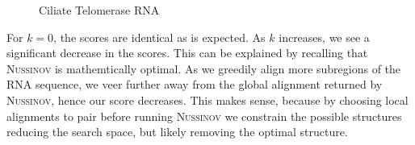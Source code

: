 \documentclass[11pt]{article}
\newcommand{\rf}{\textsc{Nussinov}\xspace}
\begin{document}
\begin{figure}[h!]
\caption{Ciliate Telomerase RNA}
\end{figure}
\newpage

For $k=0$, the scores are identical as is expected. As $k$ increases, we see a significant decrease in the scores. This can be explained by recalling that \rf is mathemtically optimal. As we greedily align more subregions of the RNA sequence, we veer further away from the global alignment returned by \rf, hence our score decreases. This makes sense, because by choosing local alignments to pair before running \rf we constrain the possible structures reducing the search space, but likely removing the optimal structure.  
\end{document}
